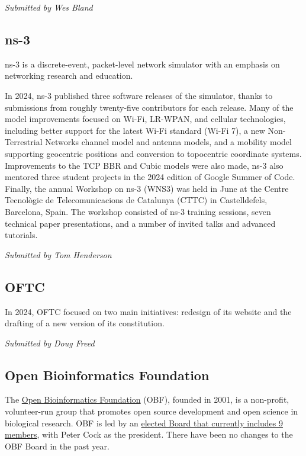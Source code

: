 \documentclass[a4paper]{report}
\begin{document}
{\em Submitted by Wes Bland} 

\subsection{ns-3}

ns-3 is a discrete-event, packet-level network simulator with an emphasis on networking research and education.

In 2024, ns-3 published three software releases of the simulator, thanks to submissions from roughly twenty-five contributors for each release. Many of the model improvements focused on Wi-Fi, LR-WPAN, and cellular technologies, including better support for the latest Wi-Fi standard (Wi-Fi 7), a new Non-Terrestrial Networks channel model and antenna models, and a mobility model supporting geocentric positions and conversion to topocentric coordinate systems. Improvements to the TCP BBR and Cubic models were also made,  ns-3 also mentored three student projects in the 2024 edition of Google Summer of Code. Finally, the annual Workshop on ns-3 (WNS3) was held in June at the Centre Tecnològic de Telecomunicacions de Catalunya (CTTC) in Castelldefels, Barcelona, Spain.  The workshop consisted of ns-3 training sessions, seven technical paper presentations, and a number of invited talks and advanced tutorials.

{\em Submitted by Tom Henderson}

\subsection{OFTC}

In 2024, OFTC focused on two main initiatives: redesign of its website and the drafting of a new version of its constitution.

{\em Submitted by Doug Freed}

\subsection{Open Bioinformatics Foundation}

The \href{https://www.open-bio.org/}{Open Bioinformatics Foundation} (OBF), founded in 2001, is a non-profit, volunteer-run group that promotes open source development and open science in biological research. OBF is led by an \href{https://www.open-bio.org/board/}{elected Board that currently includes 9 members}, with Peter Cock as the president. There have been no changes to the OBF Board in the past year.
\end{document}
